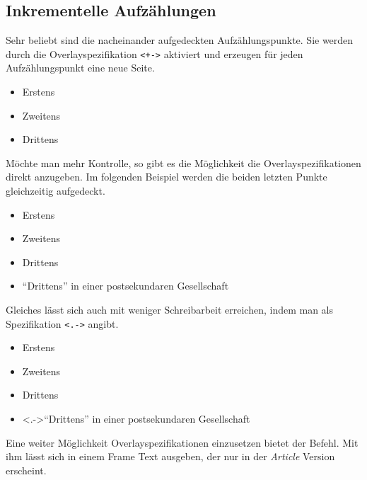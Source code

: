 \begin{lfgwcode}{}
    \tableofcontents[currentsection] %
\end{lfgwcode}

\subsection{Inkrementelle Aufzählungen}

Sehr beliebt sind die nacheinander aufgedeckten Aufzählungspunkte.
Sie werden durch die Overlayspezifikation \texttt{<+->} 
aktiviert und erzeugen für jeden Aufzählungspunkt eine neue Seite.

\begin{lfgwcode}{}
\begin{itemize}[<+->]
  \item Erstens
  \item Zweitens
  \item Drittens
\end{itemize}
\end{lfgwcode}

Möchte man mehr Kontrolle, so gibt es die Möglichkeit die
Overlayspezifikationen direkt anzugeben. Im folgenden Beispiel werden die
beiden letzten Punkte gleichzeitig aufgedeckt.

\begin{lfgwcode}{}
\begin{itemize}
  \item <1->Erstens
  \item <2->Zweitens
  \item <3->Drittens
  \item <3->"`Drittens"' in einer postsekundaren Gesellschaft
\end{itemize}
\end{lfgwcode}

Gleiches lässt sich auch mit weniger Schreibarbeit erreichen, indem man als
Spezifikation \texttt{<.->} angibt.

\begin{lfgwcode}{}
\begin{itemize}[<+->]
  \item Erstens
  \item Zweitens
  \item Drittens
  \item <.->"`Drittens"' in einer postsekundaren Gesellschaft
\end{itemize}
\end{lfgwcode}

Eine weiter Möglichkeit Overlayspezifikationen einzusetzen bietet der
 Befehl. Mit ihm lässt sich in einem Frame Text ausgeben, der
nur in der \textit{Article} Version erscheint.

